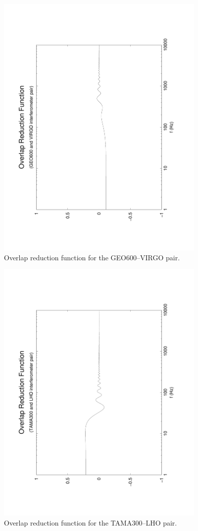 \documentclass{article}
\begin{document}
%
%
\begin{figure}[htb!]
\begin{center}
\noindent\includegraphics[width=4in,angle=-90]{GEO600VIRGO}
\caption{\label{f:GEO600VIRGO}
Overlap reduction function for the GEO600--VIRGO pair.}
\end{center}
\end{figure}
%
%
\begin{figure}[htb!]
\begin{center}
\noindent\includegraphics[width=4in,angle=-90]{TAMA300LHO}
\caption{\label{f:TAMA300LHO}
Overlap reduction function for the TAMA300--LHO pair.}
\end{center}
\end{figure}
\end{document}
